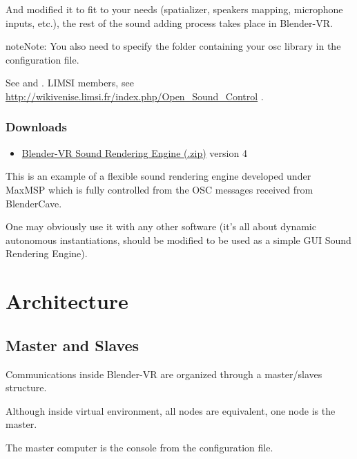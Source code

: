 \documentclass[a4,10pt,openany,oneside]{sphinxmanual}
\begin{document}
And modified it to fit to your needs (spatializer, speakers mapping, microphone inputs,
etc.), the rest of the sound adding process takes place in Blender-VR.

\begin{notice}{note}{Note:}
You also need to specify the folder containing your osc library in the configuration file.
\end{notice}

See  and .
LIMSI members, see \href{http://wikivenise.limsi.fr/index.php/Open\_Sound\_Control}{http://wikivenise.limsi.fr/index.php/Open\_Sound\_Control} .


\subsection{Downloads}
\label{components/osc:downloads}\begin{itemize}
\item {} 
\href{http://dalaifelinto.com/blendervr/ftp/blendervr\_sound\_rendering\_engine\_v4.zip}{Blender-VR Sound Rendering Engine (.zip)} version 4

\end{itemize}

This is an example of a flexible sound rendering engine developed under MaxMSP which is fully controlled from the OSC messages received from BlenderCave.

One may obviously use it with any other software (it's all about dynamic autonomous instantiations, should be modified to be used as a simple GUI Sound Rendering Engine).


\chapter{Architecture}
\label{architecture/index:architecture}\label{architecture/index::doc}

\section{Master and Slaves}
\label{architecture/master-slaves:master-and-slaves}\label{architecture/master-slaves::doc}
Communications inside Blender-VR are organized through a master/slaves structure.

Although inside virtual environment, all nodes are equivalent, one node is the master.

The master computer is the console from the configuration file.
\end{document}

